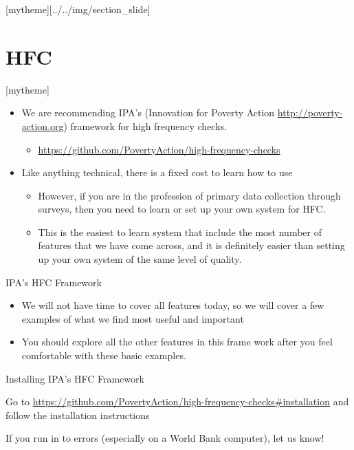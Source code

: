 \documentclass[aspectratio=169]{beamer}
\newcommand{\sectionpic}[2]{
	\setbeamertemplate{section page}[mytheme][#2]
	\section{#1}
	\setbeamertemplate{section page}[mytheme]
}
\begin{document}
\sectionpic{HFC}{../../img/section_slide}

\begin{frame}
	\begin{itemize}
		\item We are recommending IPA's (Innovation for Poverty Action \url{http://poverty-action.org}) framework for high frequency checks. 
		\begin{itemize}
			\item \url{https://github.com/PovertyAction/high-frequency-checks}
		\end{itemize}
		\item Like anything technical, there is a fixed cost to learn how to use
		\begin{itemize}
			\item However, if you are in the profession of primary data collection through surveys, then you need to learn or set up your own system for HFC. 
			\item This is the easiest to learn system that include the most number of features that we have come across, and it is definitely easier than setting up your own system of the same level of quality.
		\end{itemize}
	\end{itemize}
\end{frame}

\begin{frame}{IPA's HFC Framework}
	\begin{itemize}
		\item We will not have time to cover all features today, so we will cover a few examples of what we find most useful and important
		\item You should explore all the other features in this frame work after you feel comfortable with these basic examples.
	\end{itemize}
\end{frame}

\begin{frame}{Installing IPA's HFC Framework}

	Go to \url{https://github.com/PovertyAction/high-frequency-checks\#installation} and follow the installation instructions
	
	\vspace{.5cm}
	
	If you run in to errors (especially on a World Bank computer), let us know!

\end{frame}
\end{document}
